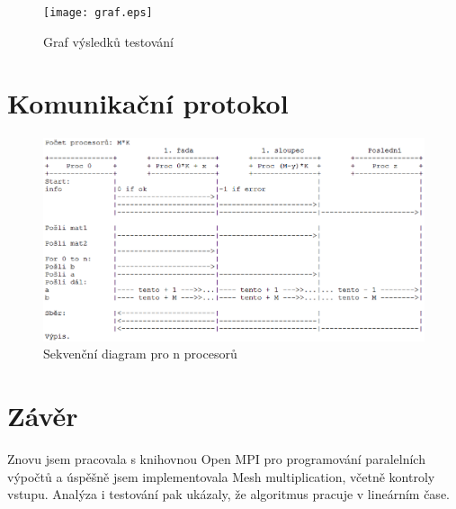 \documentclass[11pt]{article}
\begin{document}
\begin{figure}[h]
\centering
\texttt{[image: graf.eps]}
\caption{Graf výsledků testování}
\end{figure}

\newpage
\section{Komunikační protokol}
\begin{figure}[h]
\centering
\includegraphics[scale=0.7]{diagram.eps}
\caption{Sekvenční diagram pro n procesorů}
\end{figure}

\section{Závěr}
Znovu jsem pracovala s knihovnou Open MPI pro programování paralelních výpočtů a úspěšně jsem implementovala Mesh multiplication,
včetně kontroly vstupu. Analýza i testování pak ukázaly, že algoritmus pracuje v lineárním čase.
\end{document}
